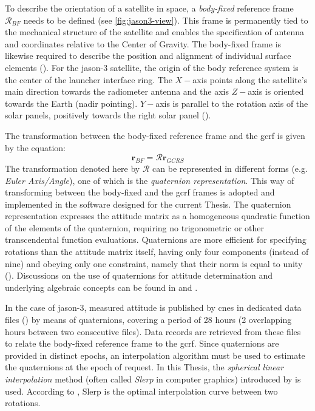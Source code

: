 To describe the orientation of a satellite in space, a \emph{body-fixed} reference 
frame $\mathcal{R}_{BF}$ needs to be defined (see \autoref{fig:jason3-view}). 
This frame is permanently tied to the mechanical 
structure of the satellite and enables the specification of antenna and coordinates 
relative to the Center of Gravity. The body-fixed frame is likewise required to describe the 
position and alignment of individual surface elements (\cite{Montenbruck2015}).
For the \gls{jason}-3 satellite, the origin of the body reference system is the center of the launcher interface ring. 
The $X-$axis points along the satellite's main direction towards the radiometer 
antenna and the axis $Z-$axis is oriented towards the Earth (nadir pointing). 
$Y-$axis is parallel to the rotation axis of the solar panels, positively 
towards the right solar panel (\cite{Zeitlhofler2019}).

The transformation between the body-fixed reference frame and the \gls{gcrf} is 
given by the equation:
\begin{equation}
  \bm{r}_{BF} = \mathcal{R} \bm{r}_{GCRS}
\end{equation}
The transformation denoted here by $\mathcal{R}$ can be represented in different 
forms (e.g. \emph{Euler Axis/Angle}), one of which is the 
\emph{quaternion representation}. This way of transforming between the body-fixed 
and the \gls{gcrf} frames is adopted and implemented in the software designed for 
the current Thesis. The quaternion representation expresses the attitude matrix as 
a homogeneous quadratic function of the elements of the quaternion, requiring no 
trigonometric or other transcendental function evaluations. Quaternions are more 
efficient for specifying rotations than the attitude matrix itself, having only 
four components (instead of nine) and obeying only one constraint, namely that 
their norm is equal to unity (\cite{Markley2019}). Discussions on the use of 
quaternions for attitude determination and underlying algebraic concepts can be 
found in \cite{Yang2012} and \cite{Markley2019}.

In the case of \gls{jason}-3, measured attitude is published by \gls{cnes} in 
dedicated data files (\cite{Ferrage2020}) by means of quaternions, covering a 
period of 28 hours (2 overlapping hours between two consecutive files). Data records 
are retrieved from these files to relate the body-fixed reference frame to the 
\gls{gcrf}. Since quaternions are provided in distinct epochs, an interpolation 
algorithm must be used to estimate the quaternions at the epoch of request. In this 
Thesis, the \emph{spherical linear interpolation} method (often called \emph{Slerp} in 
computer graphics) introduced by \cite{Shoemake1985} is used. According to \cite{Dam2000}, 
Slerp is the optimal interpolation curve between two rotations.

